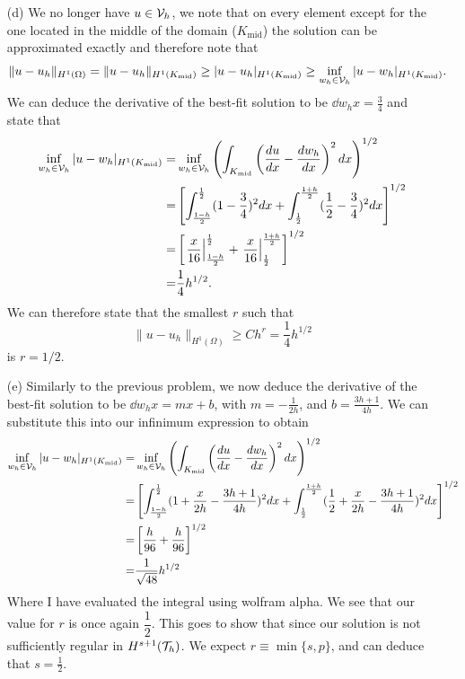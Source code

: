 \documentclass{article}
\begin{document}
\begin{itemize}
	\item[(d)] We no longer have \(u \in \mathcal{V}_h \), we note that on every element except for the one located in the middle of the domain (\(K_\text{mid} \)) the solution can be approximated exactly and therefore note that
	\begin{equation*}
		\|u-u_h\|_{H^1(\Omega)} = \|u-u_h\|_{H^1(K_\text{mid})} \geq |u-u_h|_{H^1(K_\text{mid})} \geq \inf\limits_{w_h\in\mathcal{V}_h}|u-w_h|_{H^1(K_\text{mid})}.
	\end{equation*}
	We can deduce the derivative of the best-fit solution to be \(\dd{w_h}{x} = \frac{3}{4}\) and state that
	\begin{align*}
	\inf\limits_{w_h\in \mathcal{V}_h}|u-w_h|_{H^1(K_\text{mid})} =& \inf\limits_{w_h\in \mathcal{V}_h}\left(\int_{K_\text{mid}}\left(\frac{d u}{d x} - \frac{d w_h}{d x} \right)^2dx \right)^{1/2}\\
	=& \left[\int_{\frac{1-h}{2}}^\frac{1}{2}(1-\dfrac{3}{4})^2dx + \int_{\frac{1}{2}}^\frac{1+h}{2}(\dfrac{1}{2} - \dfrac{3}{4})^2dx\right]^{1/2}\\
	=& \left[\left.\dfrac{x}{16} \right|_{\frac{1-h}{2}}^\frac{1}{2} + \left.\dfrac{x}{16} \right|_\frac{1}{2}^\frac{1+h}{2} \right]^{1/2}\\
	=& \dfrac{1}{4}h^{1/2}.
	\end{align*}
	We can therefore state that the smallest \(r\) such that 
	\begin{equation*}
		\|u - u_h\|_{H^1(\Omega)} \geq Ch^r = \dfrac{1}{4}h^{1/2}
	\end{equation*}
	is \(r = 1/2\).
	
	\item[(e)] Similarly to the previous problem, we now deduce the derivative of the best-fit solution to be \(\dd{w_h}{x} = mx+b \), with \(m = -\frac{1}{2h} \), and \(b = \frac{3h+1}{4h}\). We can substitute this into our infinimum expression to obtain
	\begin{align*}
		\inf\limits_{w_h\in \mathcal{V}_h}|u-w_h|_{H^1(K_\text{mid})} =& \inf\limits_{w_h\in \mathcal{V}_h}\left(\int_{K_\text{mid}}\left(\frac{d u}{d x} - \frac{d w_h}{d x} \right)^2dx \right)^{1/2} \\
		=& \left[\int_{\frac{1-h}{2}}^\frac{1}{2}(1+\dfrac{x}{2h}-\dfrac{3h+1}{4h})^2dx + \int_{\frac{1}{2}}^\frac{1+h}{2}(\dfrac{1}{2}+\dfrac{x}{2h}-\dfrac{3h+1}{4h})^2dx\right]^{1/2}\\
		=& \left[\dfrac{h}{96} + \dfrac{h}{96} \right]^{1/2}\\
		=& \dfrac{1}{\sqrt{48}}h^{1/2}
	\end{align*}
	Where I have evaluated the integral using wolfram alpha. We see that our value for \(r\) is once again \(\dfrac{1}{2} \). This goes to show that since our solution is not sufficiently regular in \(H^{s+1}(\mathcal{T}_h) \). We expect \(r \equiv \min\{s,p\} \), and can deduce that \(s = \frac{1}{2}\).
\end{itemize}
\end{document}
